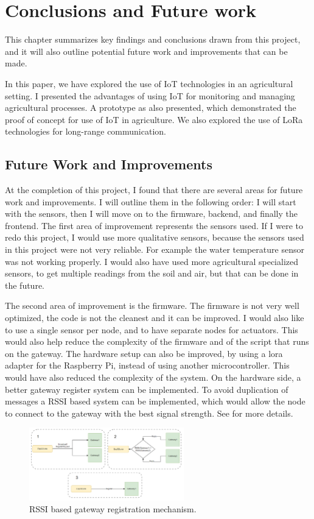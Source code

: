 \chapter{Conclusions and Future work}
This chapter summarizes key findings and conclusions drawn from this project,
and it will also outline potential future work and improvements that can be made.

In this paper, we have explored the use of IoT technologies in an agricultural setting. I presented 
the advantages of using IoT for monitoring and managing  agricultural processes. A prototype as also
presented, which demonstrated the proof of concept for use of IoT in agriculture. 
We also explored the use of LoRa technologies for long-range communication. 

\section{Future Work and Improvements}
At the completion of this project, I found that there are several areas for future work and improvements.
I will outline them in the following order: I will start with the sensors, then I will move on
to the firmware, backend, and finally the frontend. The first area of improvement represents the sensors used.
If I were to redo this project, I would use more qualitative sensors, because 
the sensors used in this project were not very reliable. For example the water temperature sensor
was not working properly. I would also have used more agricultural specialized sensors,
to get multiple readings from the soil and air, but that can be done in the future.

The second area of improvement is the firmware.
The firmware is not very well optimized, the code is not the cleanest and it can be improved.
I would also like to use a single sensor per node, and to have separate nodes for actuators.
This would also help reduce the complexity of the firmware and of the script that runs on the gateway.
The hardware setup can also be improved, by using a lora adapter for the Raspberry Pi,
instead of using another microcontroller. This would have also reduced the complexity of the system.
On the hardware side, a better gateway register system can be implemented. To avoid duplication 
of messages a RSSI based system can be implemented, which would allow the node to connect
to the gateway with the best signal strength. See \cite{lora_gateway_rssi} for more details.

\begin{figure}[ht]
    \centering
    \includegraphics[width=0.6\textwidth]{images/RSSI-mechanism.png}
    \caption{RSSI based gateway registration mechanism.}
    \label{fig:lora_gateway_rssi}
\end{figure}


